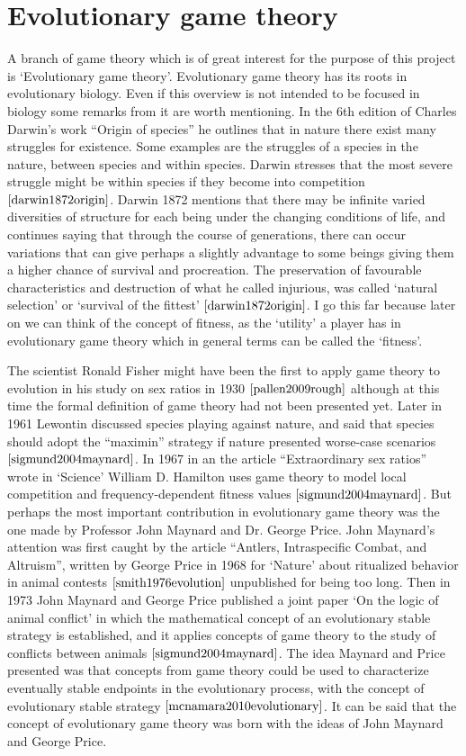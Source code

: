 \section{Evolutionary game theory}\label{EGT}
A branch of game theory which is of great interest for the purpose of this project is `Evolutionary game theory'. Evolutionary game theory has its roots in evolutionary biology. Even if this overview is not intended to be focused in biology some remarks from it are worth mentioning. In the 6th edition of Charles Darwin's work ``Origin of species'' he outlines that in nature there exist many struggles for existence. Some examples are the struggles of a species in the nature, between species and within species. Darwin stresses that the most severe struggle might be within species if they become into competition $\cite{darwin1872origin}$. Darwin 1872 mentions that there may be infinite varied diversities of structure for each being under the changing conditions of life, and continues saying that through the course of generations, there can occur variations that can give perhaps a slightly advantage to some beings giving them a higher chance of survival and procreation. The preservation of favourable characteristics and destruction of what he called injurious, was called `natural selection' or `survival of the fittest' $\cite{darwin1872origin}$. I go this far because later on we can think of the concept of fitness, as the ‘utility’ a player has in evolutionary game theory which in general terms can be called the ‘fitness’.

The scientist Ronald Fisher might have been the first to apply game theory to evolution in his study on sex ratios in 1930 $\cite{pallen2009rough}$ although at this time the formal definition of game theory had not been presented yet. Later in 1961 Lewontin discussed species playing against nature, and said that species should adopt the ``maximin'' strategy if nature presented worse-case scenarios $\cite{sigmund2004maynard}$. In 1967 in an the article ``Extraordinary sex ratios'' wrote in `Science' William D. Hamilton uses game theory to model local competition and frequency-dependent fitness values $\cite{sigmund2004maynard}$. But perhaps the most important contribution in evolutionary game theory was the one made by Professor John Maynard and Dr. George Price. John Maynard’s attention was first caught by the article ``Antlers, Intraspecific Combat, and Altruism'', written by George Price in 1968 for `Nature’ about ritualized behavior in animal contests $\cite{smith1976evolution}$ unpublished for being too long. Then in 1973 John Maynard and George Price published a joint paper ‘On the logic of animal conflict’ in which the mathematical concept of an evolutionary stable strategy is established, and it applies concepts of game theory to the study of conflicts between animals $\cite{sigmund2004maynard}$.  The idea Maynard and Price presented was that concepts from game theory could be used to characterize eventually stable endpoints in the evolutionary process, with the concept of evolutionary stable strategy $\cite{mcnamara2010evolutionary}$. It can be said that the concept of evolutionary game theory was born with the ideas of John Maynard and George Price.

